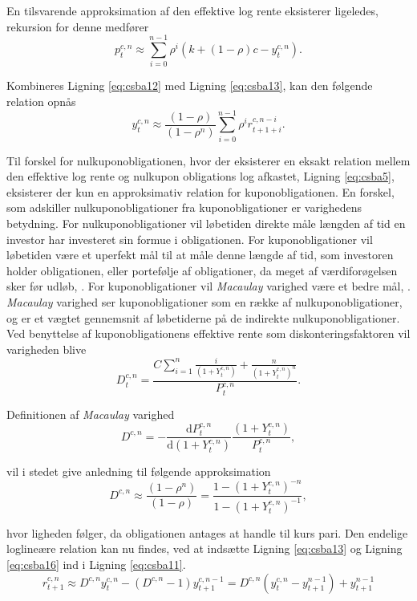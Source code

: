 \documentclass[
  a4paper,
  oneside]{memoir}
\begin{document}
En tilsvarende approksimation af den effektive log rente eksisterer ligeledes, rekursion for denne medfører
\begin{equation}
p_t^{c,n}\approx\sum_{i=0}^{n-1} \rho^i \left(k+(1-\rho)c - y_{t}^{c,n}\right). \label{eq:csba13}
\end{equation}

Kombineres Ligning \eqref{eq:csba12} med Ligning \eqref{eq:csba13}, kan den følgende relation opnås
\begin{equation}
y_{t}^{c,n}\approx \frac{(1-\rho)}{(1-\rho^n)}\sum_{i=0}^{n-1} \rho^i r_{t+1+i}^{c,n-i}. \label{eq:csba14}
\end{equation}

Til forskel for nulkuponobligationen, hvor der eksisterer en eksakt relation mellem den effektive log rente og nulkupon obligations log afkastet, Ligning \eqref{eq:csba5}, eksisterer der kun en approksimativ relation for kuponobligationen. En forskel, som adskiller nulkuponobligationer fra kuponobligationer er varighedens betydning. For nulkuponobligationer vil løbetiden direkte måle længden af tid en investor har investeret sin formue i obligationen. For kuponobligationer vil løbetiden være et uperfekt mål til at måle denne længde af tid, som investoren holder obligationen, eller portefølje af obligationer, da meget af værdiforøgelsen sker før udløb, \citep{Campbell1997}. For kuponobligationer vil \emph{Macaulay} varighed være et bedre mål, \citep{Macaulay1938}. \emph{Macaulay} varighed ser kuponobligationer som en række af nulkuponobligationer, og er et vægtet gennemsnit af løbetiderne på de indirekte nulkuponobligationer. Ved benyttelse af kuponobligationens effektive rente som diskonteringsfaktoren vil varigheden blive
\begin{equation}
D_t^{c,n}=\frac{C\sum_{i=1}^n \frac{i}{(1+Y_t^{c,n})} + \frac{n}{(1+Y_t^{c,n})^n}}{P_t^{c,n}}. \label{eq:csba15}
\end{equation}

Definitionen af \emph{Macaulay} varighed
\[D^{c,n}=-\frac{\text{d} P_t^{c,n}}{\text{d} (1+Y_t^{c,n})}\frac{(1+Y_t^{c,n})}{P_t^{c,n}},\]

vil i stedet give anledning til følgende approksimation
\begin{equation}
D^{c,n}\approx \frac{(1-\rho^n)}{(1-\rho)} = \frac{1-(1+Y_t^{c,n})^{-n}}{1-(1+Y_t^{c,n})^{-1}}, \label{eq:csba16}
\end{equation}

hvor ligheden følger, da obligationen antages at handle til kurs pari. Den endelige loglineære relation kan nu findes, ved at indsætte Ligning \eqref{eq:csba13} og Ligning \eqref{eq:csba16} ind i Ligning \eqref{eq:csba11}.
\begin{equation}
r_{t+1}^{c,n}\approx D^{c,n} y_t^{c,n} - \left(D^{c,n} - 1\right) y_{t+1}^{c,n-1}=D^{c,n}(y_t^{c,n}- y_{t+1}^{n-1}) + y_{t+1}^{n-1}  \label{eq:csba17}
\end{equation}
\end{document}
